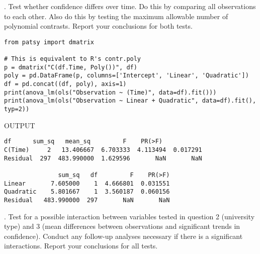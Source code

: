 \documentclass[onecolumn,10pt]{jhwhw}
\begin{document}
. Test whether confidence differs over time. Do this by comparing all observations to each other. Also do this by testing the maximum allowable number of polynomial contrasts. Report your conclusions for both tests.

\begin{lstlisting}
from patsy import dmatrix

# This is equivalent to R's contr.poly
p = dmatrix("C(df.Time, Poly())", df)
poly = pd.DataFrame(p, columns=['Intercept', 'Linear', 'Quadratic'])
df = pd.concat((df, poly), axis=1)
print(anova_lm(ols("Observation ~ (Time)", data=df).fit()))
print(anova_lm(ols("Observation ~ Linear + Quadratic", data=df).fit(), typ=2))
\end{lstlisting}
\noindent OUTPUT
\begin{lstlisting}[language={}]
           df      sum_sq   mean_sq         F    PR(>F)
C(Time)     2   13.406667  6.703333  4.113494  0.017291
Residual  297  483.990000  1.629596       NaN       NaN

               sum_sq   df         F    PR(>F)
Linear       7.605000    1  4.666801  0.031551
Quadratic    5.801667    1  3.560187  0.060156
Residual   483.990000  297       NaN       NaN
\end{lstlisting}

. Test for a possible interaction between variables tested in question 2 (university type) and 3 (mean differences between observations and significant trends in confidence). Conduct any follow-up analyses necessary if there is a significant interactions. Report your conclusions for all tests.
\end{document}
